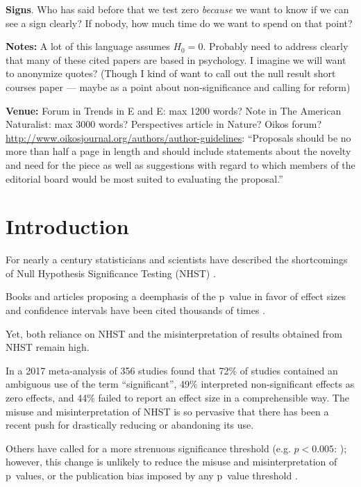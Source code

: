 \textbf{Signs}.
Who has said before that we test zero \emph{because} we want to know if we can see a sign clearly? If nobody, how much time do we want to spend on that point?

\textbf{Notes:} A lot of this language assumes $H_{0} = 0$. Probably need to address clearly that many of these cited
papers are based in psychology.
I imagine we will want to anonymize quotes? (Though I kind of want to call out the null
result short courses paper --- maybe as a point about non-significance and calling for reform)

\textbf{Venue:} Forum in Trends in E and E: max 1200 words?
Note in The American Naturalist: max 3000 words? Perspectives article in Nature?
Oikos forum? \url{http://www.oikosjournal.org/authors/author-guidelines}: ``Proposals should be no more than half a page in length and should include statements about the novelty and need for the piece as well as suggestions with regard to which members of the editorial board would be most suited to evaluating the proposal.''

\clearpage

\section*{Introduction}

For nearly a century statisticians and scientists have described the shortcomings of Null Hypothesis Significance Testing (NHST) \citep[see][]{Cohen1994}.

Books and articles proposing a deemphasis of the p~value in favor of effect sizes and confidence intervals have been cited thousands of times \citep{Cohen1994, Goodman1999, Wilkinson1999, ZiliakandMcCloskey2008, WassersteinandLazar2016}.

Yet, both reliance on NHST and the misinterpretation of results obtained from NHST remain high.

In a 2017 meta-analysis of 356 studies \citet{Bernardietal.2017} found that 72\% of studies contained an ambiguous use of the term ``significant'', 
49\% interpreted non-significant effects as zero effects, and 44\% failed to report an effect size in a comprehensible 
way.
The misuse and misinterpretation of NHST is so pervasive that there has been a recent push for drastically reducing 
\citep{SzucsandIoannidis2017} or abandoning \citep{McShaneetal.2017} its use.

Others have called for a more
strenuous significance threshold (e.g.
$p < 0.005$: \citealt{Benjaminetal.2018}); however, this change is unlikely to reduce
the misuse and misinterpretation of p~values, or the publication bias imposed by any p~value threshold \citep{Ridleyetal.2007}.

